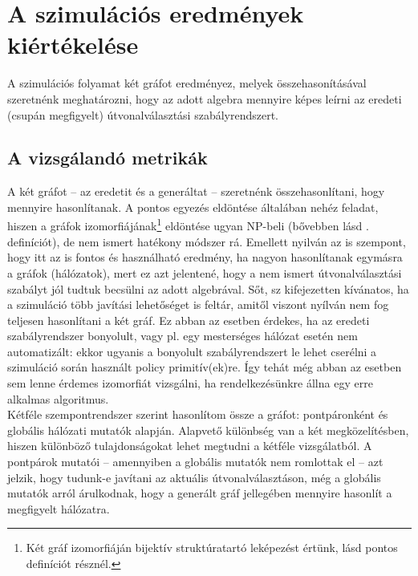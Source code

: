   \section{A szimulációs eredmények kiértékelése}
  A szimulációs folyamat két gráfot eredményez, melyek összehasonításával szeretnénk meghatározni, hogy az adott algebra mennyire képes leírni az eredeti (csupán megfigyelt) útvonalválasztási szabályrendszert.

    \subsection{A vizsgálandó metrikák}\label{metrikak}
    A két gráfot -- az eredetit és a generáltat -- szeretnénk összehasonlítani, hogy mennyire hasonlítanak. A pontos egyezés eldöntése általában nehéz feladat, hiszen a gráfok izomorfiájának\footnote{Két gráf izomorfiáján bijektív struktúratartó leképezést értünk, lásd pontos definíciót  résznél.} eldöntése ugyan NP-beli (bővebben lásd . definíciót), de nem ismert hatékony módszer rá. Emellett nyilván az is szempont, hogy itt az is fontos és használható eredmény, ha nagyon hasonlítanak egymásra a gráfok (hálózatok), mert ez azt jelentené, hogy a nem ismert útvonalválasztási szabályt jól tudtuk becsülni az adott algebrával. Sőt, sz kifejezetten kívánatos, ha a szimuláció több javítási lehetőséget is feltár, amitől viszont nyílván nem fog teljesen hasonlítani a két gráf. Ez abban az esetben érdekes, ha az eredeti szabályrendszer bonyolult, vagy pl. egy mesterséges hálózat esetén nem automatizált: ekkor ugyanis a bonyolult szabályrendszert le lehet cserélni a szimuláció során használt policy primitív(ek)re. Így tehát még abban az esetben sem lenne érdemes izomorfiát vizsgálni, ha rendelkezésünkre állna egy erre alkalmas algoritmus.\\

    Kétféle szempontrendszer szerint hasonlítom össze a gráfot: pontpáronként és globális hálózati mutatók alapján. Alapvető különbség van a két megközelítésben, hiszen különböző tulajdonságokat lehet megtudni a kétféle vizsgálatból. A pontpárok mutatói -- amennyiben a globális mutatók nem romlottak el -- azt jelzik, hogy tudunk-e javítani az aktuális útvonalválasztáson, még a globális mutatók arról árulkodnak, hogy a generált gráf jellegében mennyire hasonlít a megfigyelt hálózatra.\\

